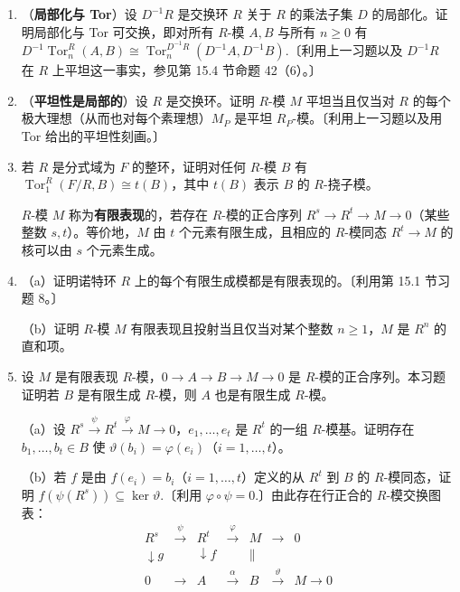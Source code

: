 \begin{enumerate}
\item （\textbf{局部化与 Tor}）设 \(D^{-1}R\) 是交换环 \(R\) 关于 \(R\) 的乘法子集 \(D\) 的局部化。证明局部化与 Tor 可交换，即对所有 \(R\)-模 \(A, B\) 与所有 \(n \geq 0\) 有 \(D^{-1}\operatorname{Tor}_n^R(A, B) \cong \operatorname{Tor}_n^{D^{-1}R}(D^{-1}A, D^{-1}B)\).〔利用上一习题以及 \(D^{-1}R\) 在 \(R\) 上平坦这一事实，参见第 15.4 节命题 42（6）。〕

\item （\textbf{平坦性是局部的}）设 \(R\) 是交换环。证明 \(R\)-模 \(M\) 平坦当且仅当对 \(R\) 的每个极大理想（从而也对每个素理想）\(M_P\) 是平坦 \(R_P\)-模。〔利用上一习题以及用 Tor 给出的平坦性刻画。〕

\item 若 \(R\) 是分式域为 \(F\) 的整环，证明对任何 \(R\)-模 \(B\) 有 \(\operatorname{Tor}_1^R(F/R, B) \cong t(B)\)，其中 \(t(B)\) 表示 \(B\) 的 \(R\)-挠子模。

\noindent \(R\)-模 \(M\) 称为\textbf{有限表现}的，若存在 \(R\)-模的正合序列 \(R^s \to R^t \to M \to 0\)（某些整数 \(s, t\)）。等价地，\(M\) 由 \(t\) 个元素有限生成，且相应的 \(R\)-模同态 \(R^t \to M\) 的核可以由 \(s\) 个元素生成。

\item （a）证明诺特环 \(R\) 上的每个有限生成模都是有限表现的。〔利用第 15.1 节习题 8。〕

（b）证明 \(R\)-模 \(M\) 有限表现且投射当且仅当对某个整数 \(n \geq 1\)，\(M\) 是 \(R^n\) 的直和项。

\item 设 \(M\) 是有限表现 \(R\)-模，\(0 \to A \to B \to M \to 0\) 是 \(R\)-模的正合序列。本习题证明若 \(B\) 是有限生成 \(R\)-模，则 \(A\) 也是有限生成 \(R\)-模。

（a）设 \(R^s \xrightarrow{\psi} R^t \xrightarrow{\varphi} M \to 0\)，\(e_1, \ldots, e_t\) 是 \(R^t\) 的一组 \(R\)-模基。证明存在 \(b_1, \ldots, b_t \in B\) 使 \(\vartheta(b_i) = \varphi(e_i)\)（\(i = 1, \ldots, t\)）。

（b）若 \(f\) 是由 \(f(e_i) = b_i\)（\(i = 1, \ldots, t\)）定义的从 \(R^t\) 到 \(B\) 的 \(R\)-模同态，证明 \(f(\psi(R^s)) \subseteq \ker\vartheta\).〔利用 \(\varphi \circ \psi = 0\).〕由此存在行正合的 \(R\)-模交换图表：
\[
\begin{array}{ccccccc}
R^s & \xrightarrow{\psi} & R^t & \xrightarrow{\varphi} & M & \to & 0\\
\downarrow g & & \downarrow f & & \parallel & & \\
0 & \to & A & \xrightarrow{\alpha} & B & \xrightarrow{\vartheta} & M \to 0
\end{array}
\]


\end{enumerate}

